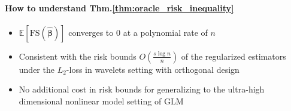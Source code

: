 \documentclass[twoside]{article}
\begin{document}
\paragraph*{How to understand Thm.\ref{thm:oracle_risk_inequality}}
\begin{itemize}
    \item $\mathbb{E}\left[\mathrm{FS}\left(\hat{\boldsymbol{\beta}}\right)\right]$ converges to 0 at a polynomial rate of $n$
    \item Consistent with the risk bounds $O\left(\frac{s\log n}{n}\right)$ of the regularized estimators under the $L_2$-loss in wavelets setting with orthogonal design 
    \item No additional cost in risk bounds for generalizing to the ultra-high dimensional nonlinear model setting of GLM
\end{itemize}
\end{document}
